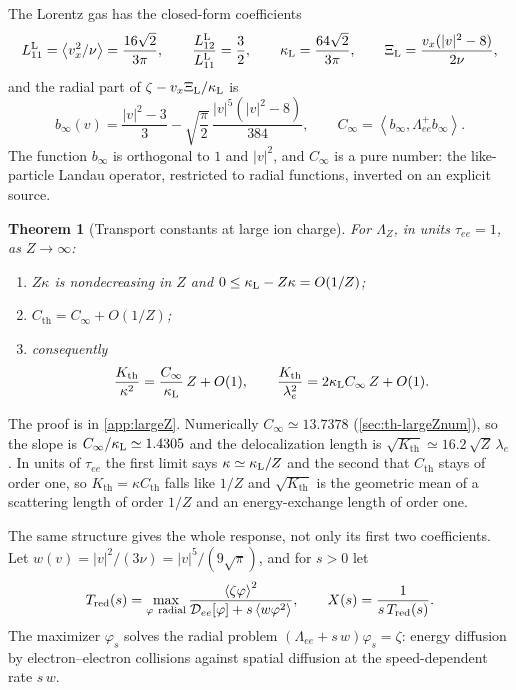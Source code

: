 \documentclass[11pt]{article}
\newcommand{\av}[1]{\left\langle #1\right\rangle}
\newcommand{\D}{\mathcal D}
\newcommand{\kap}{\kappa}
\newcommand{\thr}{\mathrm{th}}
\newtheorem{theorem}{Theorem}[section]
\theoremstyle{definition}
\theoremstyle{remark}
\numberwithin{equation}{section}
\begin{document}
The Lorentz gas has the closed-form coefficients
\[
 L_{11}^{\rm L}=\av{v_x^2/\nu}=\frac{16\sqrt2}{3\pi},\qquad
 \frac{L_{12}^{\rm L}}{L_{11}^{\rm L}}=\frac32,\qquad
 \kap_{\rm L}=\frac{64\sqrt2}{3\pi},\qquad
 \Xi_{\rm L}=\frac{v_x(|v|^2-8)}{2\nu},
\]
and the radial part of $\zeta-v_x\Xi_{\rm L}/\kap_{\rm L}$ is
\begin{equation}
 b_\infty(v)=\frac{|v|^2-3}{3}-\sqrt{\frac\pi2}\,\frac{|v|^5(|v|^2-8)}{384},
 \qquad C_\infty=\av{b_\infty,\Lambda_{ee}^+b_\infty} .
 \label{eq:LZ-binf}
\end{equation}
The function $b_\infty$ is orthogonal to $1$ and $|v|^2$, and $C_\infty$ is
a pure number: the like-particle Landau operator, restricted to radial
functions, inverted on an explicit source.

\begin{theorem}[Transport constants at large ion charge]\label{thm:largeZ}
For $\Lambda_Z$, in units $\tau_{ee}=1$, as $Z\to\infty$:
\begin{enumerate}[label=(\alph*)]
\item $Z\kap$ is nondecreasing in $Z$ and
$0\leq\kap_{\rm L}-Z\kap=O(1/Z)$;
\item $C_\thr=C_\infty+O(1/Z)$;
\item consequently
\begin{equation}
 \frac{K_\thr}{\kap^2}=\frac{C_\infty}{\kap_{\rm L}}\,Z+O(1),
 \qquad
 \frac{K_\thr}{\lambda_e^2}=2\kap_{\rm L}C_\infty\,Z+O(1).
 \label{eq:LZ-slope}
\end{equation}
\end{enumerate}
\end{theorem}

The proof is in \cref{app:largeZ}. Numerically $C_\infty\simeq13.7378$
(\cref{sec:th-largeZnum}), so the slope is
$C_\infty/\kap_{\rm L}\simeq1.4305$ and the delocalization length is
$\sqrt{K_\thr}\simeq16.2\,\sqrt Z\,\lambda_e$. In units of $\tau_{ee}$ the
first limit says $\kap\simeq\kap_{\rm L}/Z$ and the second that $C_\thr$
stays of order one, so $K_\thr=\kap C_\thr$ falls like $1/Z$ and
$\sqrt{K_\thr}$ is the geometric mean of a scattering length of order
$1/Z$ and an energy-exchange length of order one.

The same structure gives the whole response, not only its first two
coefficients. Let $w(v)=|v|^2/(3\nu)=|v|^5/(9\sqrt\pi)$, and for $s>0$ let
\begin{equation}
 T_{\rm red}(s)=\max_{\varphi\ {\rm radial}}
   \frac{\av{\zeta\varphi}^2}{\D_{ee}[\varphi]+s\av{w\varphi^2}},
 \qquad X(s)=\frac1{s\,T_{\rm red}(s)} .
 \label{eq:LZ-red}
\end{equation}
The maximizer $\varphi_s$ solves the radial problem
$(\Lambda_{ee}+s\,w)\varphi_s=\zeta$: energy diffusion by
electron--electron collisions against spatial diffusion at the
speed-dependent rate $s\,w$.
\end{document}
